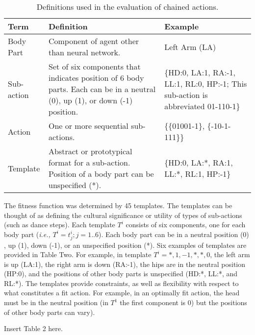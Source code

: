 \documentclass[a4paper,12pt,man,british]{apa6}
\begin{document}
\begin{table}
\caption{Definitions used in the evaluation of chained actions.}
 \label{tab:definitiontable}
\setlength{\tabcolsep}{1em}
\setlength{\extrarowheight}{6pt}
\centering
 	\begin{tabular}{>{\raggedright}p{2.50cm}>{\raggedright}p{5cm}>{\raggedright\arraybackslash}p{5cm}}
	\toprule
	\hline
  Term & Definition & Example \\
  \midrule
   Body Part & \nohyphens{Component of agent other than neural network.} & Left Arm (LA) \\
   \nohyphens{Sub-action} & \nohyphens{Set of six components that indicates position of 6 body parts. Each can be in a neutral (0), up (1), or down (-1) position.} & \{HD:0, LA:1, RA:-1, LL:1, RL:0, HP:-1; \nohyphens{This sub-action is abbreviated 01-110-1\}}\\
   \nohyphens{Action} &  \nohyphens{One or more sequential sub-actions.} & \{\{01001-1\}, \{-10-1-111\}\}  \\
 \nohyphens{Template} & \nohyphens{Abstract or prototypical format for a sub-action. Position of a body part can be unspecified (*).} & \{HD:0, LA:*, RA:1, LL:*, RL:1, HP:-1\} \\
\hline
 \bottomrule
 \end{tabular}
\end{table}

The fitness function was determined by 45 templates. The templates can be thought of as defining the cultural significance or utility of types of sub-actions (such as dance steps). Each template $T^i$ consists of six components, one for each body part (\emph{i.e.,} $T^i={t_j^i };j=1..6$). Each body part can be in a neutral position (0) , up (1), down (-1), or an unspecified position (*). Six examples of templates are provided in Table Two. For example, in template $T^i={*,1,-1,*,*,0}$, the left arm is up (LA:1), the right arm is down (RA:-1), the hips are in the neutral position (HP:0), and the positions of other body parts is unspecified (HD:*, LL:*, and RL:*). The templates provide constraints, as well as flexibility with respect to what constitutes a fit action. For example, in an optimally fit action, the head must be in the neutral position (in $T^1$ the first component is 0) but the positions of other body parts can vary). 

\begin{center}
Insert Table 2 here.
\end{center}
\end{document}
